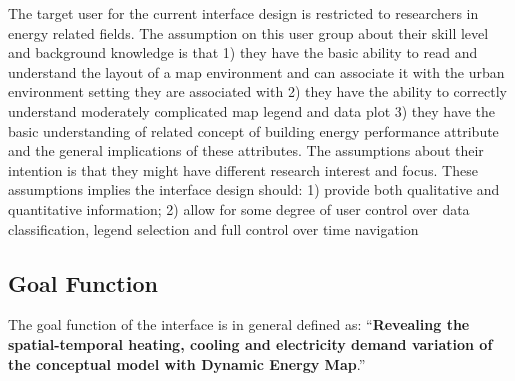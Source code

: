 The target user for the current interface design is restricted to
researchers in energy related fields. The assumption on this user
group about their skill level and background knowledge is that 1) they
have the basic ability to read and understand the layout of a map
environment and can associate it with the urban environment setting
they are associated with 2) they have the ability to correctly
understand moderately complicated map legend and data plot 3) they
have the basic understanding of related concept of building energy
performance attribute and the general implications of these
attributes. The assumptions about their intention is that they might
have different research interest and focus. These assumptions implies
the interface design should: 1) provide both qualitative and
quantitative information; 2) allow for some degree of user control
over data classification, legend selection and full control over time
navigation

\subsection{Goal Function}
The goal function of the interface is in general defined as:
``\textbf{Revealing the spatial-temporal heating, cooling and
  electricity demand variation of the conceptual model with Dynamic
  Energy Map}.''

